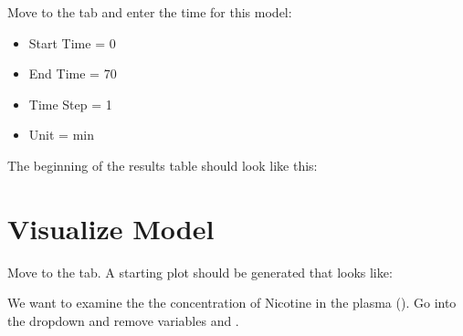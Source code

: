 \documentclass[letterpaper,10pt,english]{sphinxmanual}
\begin{document}
\sphinxAtStartPar
Move to the  tab and enter the time for this model:
\begin{itemize}
\item {} 
\sphinxAtStartPar
Start Time = 0

\item {} 
\sphinxAtStartPar
End Time = 70

\item {} 
\sphinxAtStartPar
Time Step = 1

\item {} 
\sphinxAtStartPar
Unit = min

\end{itemize}

\begin{figure}[htbp]
\centering

\noindent{}
\end{figure}

\sphinxAtStartPar
The beginning of the results table should look like this:

\begin{figure}[htbp]
\centering

\noindent{}
\end{figure}


\section{Visualize Model}
\label{\detokenize{pages/tutorial_par_estimation:visualize-model}}
\sphinxAtStartPar
Move to the  tab. A starting plot should be generated that
looks like:

\begin{figure}[htbp]
\centering

\noindent{}
\end{figure}

\sphinxAtStartPar
We want to examine the the concentration of Nicotine in the plasma ().
Go into the  dropdown and remove variables  and .

\begin{figure}[htbp]
\centering

\noindent{}
\end{figure}
\end{document}
